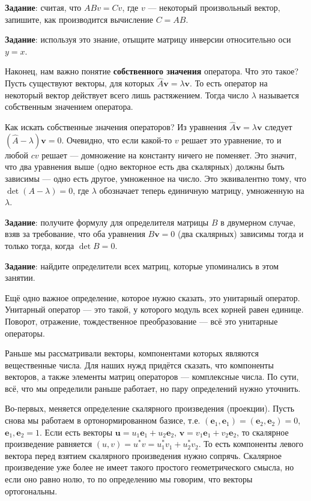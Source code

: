 \documentclass[12pt]{article}
\begin{document}
{\bf Задание}: считая, что $AB v = Cv$, где $v$ --- некоторый произвольный вектор, запишите, как производится вычисление $C = AB$.

{\bf Задание}: используя это знание, отыщите матрицу инверсии относительно оси $y = x$.

Наконец, нам важно понятие {\bf собственного значения} оператора. Что это такое? Пусть существуют векторы, для которых $\hat{A} \mathbf{v} = \lambda \mathbf{v}$. То есть оператор на некоторый вектор действует всего лишь растяжением. Тогда число $\lambda$ называется собственным значением оператора.

Как искать собственные значения операторов? Из уравнения $\hat{A} \mathbf{v} = \lambda \mathbf{v}$ следует $(\hat{A} - \lambda) \mathbf{v} = 0$. Очевидно, что если какой-то $v$ решает это уравнение, то и любой $cv$ решает --- домножение на константу ничего не поменяет. Это значит, что два уравнения выше (одно векторное есть два скалярных) должны быть зависимы --- одно есть другое, умноженное на число. Это эквивалентно тому, что $\det (A - \lambda) = 0$, где $\lambda$ обозначает теперь единичную матрицу, умноженную на $\lambda$.

{\bf Задание}: получите формулу для определителя матрицы $B$ в двумерном случае, взяв за требование, что оба уравнения $B \mathbf{v} = 0$ (два скалярных) зависимы тогда и только тогда, когда $\det B = 0$.

{\bf Задание}: найдите определители всех матриц, которые упоминались в этом занятии.

Ещё одно важное определение, которое нужно сказать, это унитарный оператор. Унитарный оператор --- это такой, у которого модуль всех корней равен единице. Поворот, отражение, тождественное преобразование --- всё это унитарные операторы.

Раньше мы рассматривали векторы, компонентами которых являются вещественные числа. Для наших нужд придётся сказать, что компоненты векторов, а также элементы матриц операторов --- комплексные числа. По сути, всё, что мы определили раньше работает, но пару определений нужно уточнить. 

Во-первых, меняется определение скалярного произведения (проекции). Пусть снова мы работаем в ортонормированном базисе, т.е. $(\mathbf{e}_1, \mathbf{e}_1) = (\mathbf{e}_2, \mathbf{e}_2) = 0$, $\mathbf{e}_1, \mathbf{e}_2 = 1$. Если есть векторы $\mathbf{u} = u_1 \mathbf{e}_1 + u_2 \mathbf{e}_2$, $\mathbf{v} = v_1 \mathbf{e}_1 + v_2 \mathbf{e}_2$, то скалярное произведение равняется $(u, v) = u^* v = u_1^* v_1 + u_2^* v_2$. То есть компоненты левого вектора перед взятием скалярного произведения нужно сопрячь. Скалярное произведение уже более не имеет такого простого геометрического смысла, но если оно равно нолю, то по определению мы говорим, что векторы ортогональны.
\end{document}
